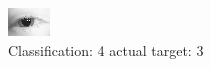 \begin{figure}[h!]
\begin{center}
\includegraphics[width=0.60\columnwidth]{figures/ID57_class_4_target_3.png}
\end{center}
\caption{ Classification: 4 actual target: 3}
\label{fig:ID57_class_4_target_3}
\end{figure}
